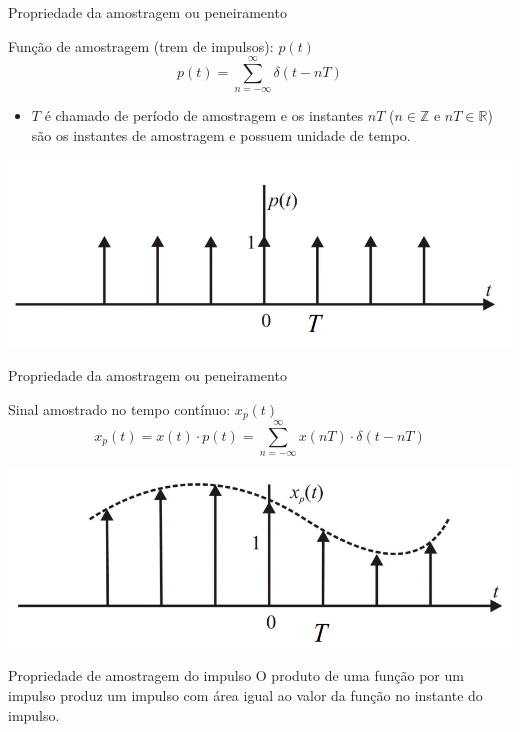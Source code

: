 \begin{frame}{Propriedade da amostragem ou peneiramento}
\begin{block}{}
Função de amostragem (trem de impulsos): $p(t)$
$$\boxed{p(t) = \sum_{n=-\infty}^{\infty}\delta(t-nT)}$$
\begin{itemize}
    \item $T$ é chamado de período de amostragem e os instantes $nT$ ($n \in \mathbb{Z}$ e $nT \in \mathbb{R}$) são os instantes de amostragem e possuem unidade de tempo.
\end{itemize}
\end{block}
\centerline{\includegraphics[width=0.8\linewidth]{Figuras/Ch02/fig5.PNG}}
\end{frame}

\begin{frame}{Propriedade da amostragem ou peneiramento}
\begin{block}{}
Sinal amostrado no tempo contínuo: $x_p(t)$
$$\boxed{x_p(t) = x(t) \cdot p(t) = \sum_{n=-\infty}^{\infty}x(nT) \cdot \delta(t-nT)}$$
\end{block}
\centerline{\includegraphics[width=0.7\linewidth]{Figuras/Ch02/fig6.PNG}}
\begin{block}{Propriedade de amostragem do impulso}
O produto de uma função por um impulso produz um impulso com área igual ao valor da função no instante do impulso.
\end{block}
\end{frame}

